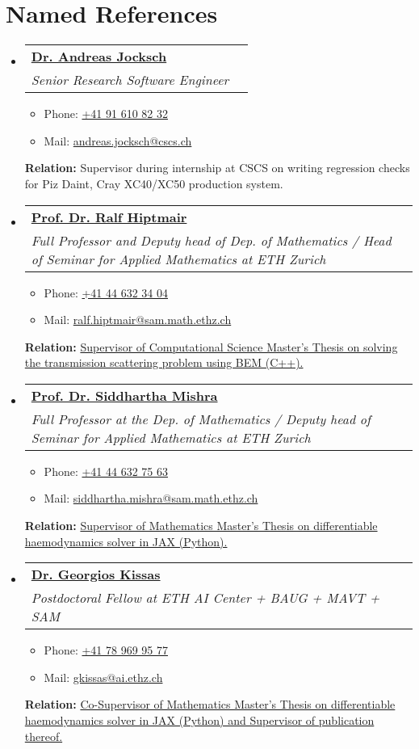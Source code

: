 \documentclass[letterpaper,11pt]{article}
\makeatletter
\newcommand{\resumeItem}[1]{%
\item\small{
		#1
	}
}
\newcommand{\resumeSubheading}[4]{
	\vspace{8pt}\item
	\begin{tabular*}{0.97\textwidth}[t]{l@{\extracolsep{\fill}}r}
		\textbf{#1} & #2 \\
		\textit{\small#3} & \textit{\small #4} \\
	\end{tabular*}\vspace{-5pt}
}
\newcommand{\resumeSubHeadingListStart}{\begin{itemize}[leftmargin=*]}
\newcommand{\resumeSubHeadingListEnd}{\end{itemize}}
\newcommand{\resumeItemListStart}{\begin{itemize}}
\newcommand{\resumeItemListEnd}{\end{itemize}\vspace{-5pt}}
\newcommand{\resumeTech}[2]{
	\textbf{#1:} #2
}
\makeatother
\begin{document}
\section{Named References}
\resumeSubHeadingListStart
\resumeSubheading
{\href{https://www.cscs.ch/about/staff}{Dr. Andreas Jocksch}}{ }
{Senior Research Software Engineer}{ }
\resumeItemListStart
\resumeItem{Phone: \href{tel:+41916108232}{+41 91 610 82 32}}
\resumeItem{Mail: \href{mailto:andreas.jocksch@cscs.ch}{andreas.jocksch@cscs.ch}}
\resumeItemListEnd
\resumeTech{Relation}{Supervisor during internship at CSCS on writing regression checks for Piz Daint, Cray XC40/XC50 production system.}

\resumeSubheading
{\href{https://math.ethz.ch/sam/the-institute/people/ralf-hiptmair.html}{Prof. Dr. Ralf Hiptmair}}{ }
{Full Professor and Deputy head of Dep. of Mathematics / Head of Seminar for Applied Mathematics at ETH Zurich}{ }
\resumeItemListStart
\resumeItem{Phone: \href{tel:+41446323404}{+41 44 632 34 04}}
\resumeItem{Mail: \href{mailto:ralf.hiptmair@sam.math.ethz.ch}{ralf.hiptmair@sam.math.ethz.ch}}
\resumeItemListEnd
\resumeTech{Relation}{\href{https://github.com/DiegoRenner/HelmholtzTransmissionProblemBEM}{Supervisor of Computational Science Master's Thesis on solving the transmission scattering problem using BEM (C++).}}

\pagebreak
\resumeSubheading
{\href{https://math.ethz.ch/sam/the-institute/people/siddhartha-mishra.html}{Prof. Dr. Siddhartha Mishra}}{ }
{Full Professor at the Dep. of Mathematics / Deputy head of Seminar for Applied Mathematics at ETH Zurich}{ }
\resumeItemListStart
\resumeItem{Phone: \href{tel:+41446327563}{+41 44 632 75 63}}
\resumeItem{Mail: \href{mailto:siddhartha.mishra@sam.math.ethz.ch}{siddhartha.mishra@sam.math.ethz.ch}}
\resumeItemListEnd
\resumeTech{Relation}{\href{https://github.com/DiegoRenner/jaxFlowSim}{Supervisor of Mathematics Master's Thesis on differentiable haemodynamics solver in JAX (Python).}}

\resumeSubheading
{\href{https://math.ethz.ch/sam/the-institute/people/siddhartha-mishra.html}{Dr. Georgios Kissas}}{ }
{Postdoctoral Fellow at ETH AI Center + BAUG + MAVT + SAM}{ }
\resumeItemListStart
\resumeItem{Phone: \href{tel:+41789699577}{+41 78 969 95 77}}
\resumeItem{Mail: \href{mailto:gkissas@ai.ethz.ch}{gkissas@ai.ethz.ch}}
\resumeItemListEnd
\resumeTech{Relation}{\href{https://github.com/DiegoRenner/jaxFlowSim}{Co-Supervisor of Mathematics Master's Thesis on differentiable haemodynamics solver in JAX (Python) and Supervisor of publication thereof.}}
\resumeSubHeadingListEnd
\end{document}
